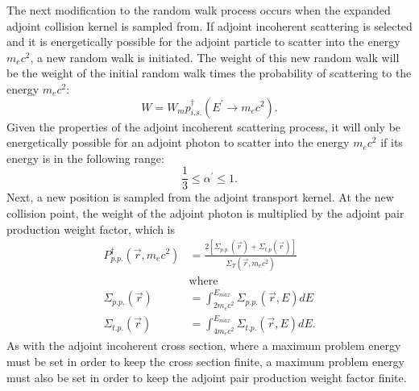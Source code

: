 The next modification to the random walk process occurs when the expanded 
adjoint collision kernel is sampled from. If adjoint incoherent scattering is 
selected and it is energetically possible for the adjoint particle to 
scatter into the energy $m_ec^2$, a new random walk is initiated. The weight 
of this new random walk will be the weight of the initial random walk times the 
probability of scattering to the energy $m_ec^2$:
\begin{equation}
  W = W_m p_{i.s.}^{\dagger}(E^{'} \to m_ec^2).
\end{equation}
Given the properties of the adjoint incoherent scattering process, it will
only be energetically possible for an adjoint photon to scatter into the
energy $m_ec^2$ if its energy is in the following range:
\begin{equation}
  \frac{1}{3} \leq \alpha^{'} \leq 1.
\end{equation}
Next, a new position is sampled from the adjoint transport kernel. At the
new collision point, the weight of the adjoint photon is multiplied by the 
adjoint pair production weight factor, which is 
\begin{align}
  P_{p.p.}^{\dagger}(\vec{r},m_ec^2) & = 
  \frac{2\left[\Sigma_{p.p.}(\vec{r})+\Sigma_{t.p}(\vec{r})\right]}
       {\Sigma_T(\vec{r},m_ec^2)} \\
  & \text{where} \nonumber \\
  \Sigma_{p.p.}(\vec{r}) & = \int_{2m_ec^2}^{E_{max}}\Sigma_{p.p.}(\vec{r},E)dE \\
  \Sigma_{t.p.}(\vec{r}) & = \int_{4m_ec^2}^{E_{max}}\Sigma_{t.p.}(\vec{r},E)dE.
\end{align} 
As with the adjoint incoherent cross section, where a maximum problem energy 
must be set in order to keep the cross section finite, a maximum problem energy 
must also be set in order to keep the adjoint pair production weight factor 
finite. 

